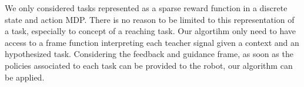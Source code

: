 We only considered tasks represented as a sparse reward function in a discrete state and action MDP. There is no reason to be limited to this representation of a task, especially to concept of a reaching task. Our algortihm only need to have access to a frame function interpreting each teacher signal given a context and an hypothesized task. Considering the feedback and guidance frame, as soon as the policies associated to each task can be provided to the robot, our algorithm can be applied. 







